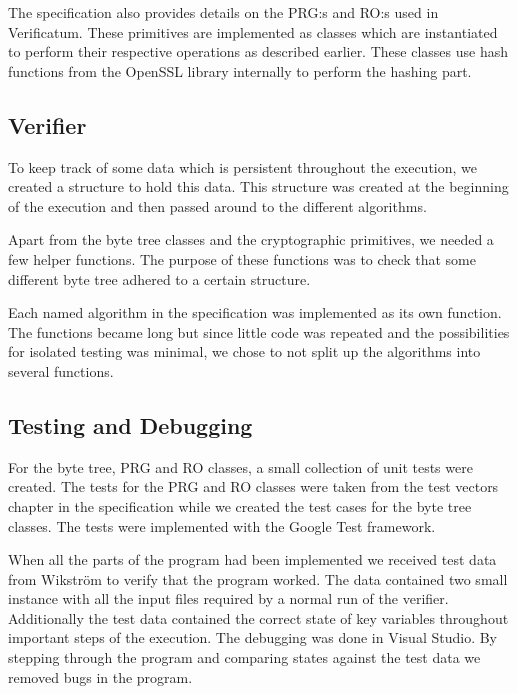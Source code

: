The specification also provides details on the PRG:s and RO:s used in
Verificatum. These primitives are implemented as classes which are
instantiated to perform their respective operations as described
earlier. These classes use hash functions from the OpenSSL library
internally to perform the hashing part.

\subsection{Verifier}

To keep track of some data which is persistent throughout the
execution, we created a structure to hold this data. This structure
was created at the beginning of the execution and then passed around
to the different algorithms.

Apart from the byte tree classes and the cryptographic primitives, we
needed a few helper functions. The purpose of these functions was to
check that some different byte tree adhered to a certain structure.

Each named algorithm in the specification was implemented as its own
function. The functions became long but since little code was repeated
and the possibilities for isolated testing was minimal, we chose to
not split up the algorithms into several functions.

\subsection{Testing and Debugging}

For the byte tree, PRG and RO classes, a small collection of unit
tests were created. The tests for the PRG and RO classes were taken
from the test vectors chapter in the specification while we created
the test cases for the byte tree classes. The tests were implemented
with the Google Test framework.

When all the parts of the program had been implemented we received
test data from Wikström to verify that the program worked. The data
contained two small instance with all the input files required by a
normal run of the verifier. Additionally the test data contained the
correct state of key variables throughout important steps of the
execution. The debugging was done in Visual Studio. By stepping
through the program and comparing states against the test data we
removed bugs in the program.
